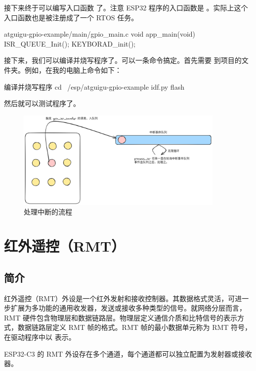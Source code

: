 \documentclass[lang=cn,newtx,10pt,scheme=chinese]{elegantbook}
\begin{document}
接下来终于可以编写入口函数  了。注意 ESP32 程序的入口函数是  。实际上这个入口函数也是被注册成了一个 RTOS 任务。

\begin{mycode}{atguigu-gpio-example/main/gpio\_main.c}
void app_main(void)
{
    ISR_QUEUE_Init();
    KEYBORAD_init();
}
\end{mycode}

接下来，我们可以编译并烧写程序了。可以一条命令搞定。首先需要  到项目的文件夹。例如，在我的电脑上命令如下：

\begin{mycode}{编译并烧写程序}
cd ~/esp/atguigu-gpio-example
idf.py flash
\end{mycode}

然后就可以测试程序了。

\begin{figure}[!htb]
\centering
\includegraphics[width=0.9\textwidth]{process_isr.png}
\caption{处理中断的流程}
\end{figure}

\chapter{红外遥控（RMT）}

\section{简介}

红外遥控（RMT）外设是一个红外发射和接收控制器。其数据格式灵活，可进一步扩展为多功能的通用收发器，发送或接收多种类型的信号。就网络分层而言，RMT 硬件包含物理层和数据链路层。物理层定义通信介质和比特信号的表示方式，数据链路层定义 RMT 帧的格式。RMT 帧的最小数据单元称为 RMT 符号，在驱动程序中以  表示。

ESP32-C3 的 RMT 外设存在多个通道，每个通道都可以独立配置为发射器或接收器。
\end{document}
